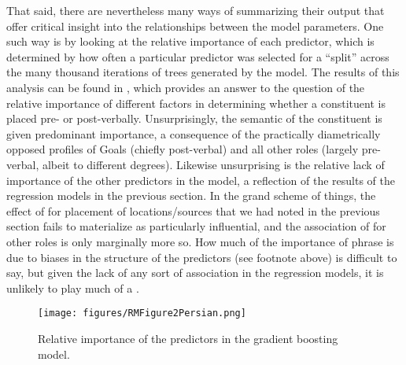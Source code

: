 \documentclass[output=paper,colorlinks,citecolor=brown,draftmode]{langscibook}
\begin{document}
That said, there are nevertheless many ways of summarizing their output that offer critical insight into the relationships between the model parameters. One such way is by looking at the relative importance of each predictor, which is determined by how often a particular predictor was selected for a ``split'' across the many thousand iterations of trees generated by the model. The results of this analysis can be found in , which provides an answer to the question of the relative importance of different factors in determining whether a constituent is placed pre- or post-verbally. Unsurprisingly, the semantic  of the constituent is given predominant importance, a consequence of the practically diametrically opposed profiles of Goals (chiefly post-verbal) and all other roles (largely pre-verbal, albeit to different degrees). Likewise unsurprising is the relative lack of importance of the other predictors in the model, a reflection of the results of the regression models in the previous section. In the grand scheme of things, the effect of  for placement of locations/sources that we had noted in the previous section fails to materialize as particularly influential, and the association of  for other  roles is only marginally more so. How much of the importance of phrase  is due to biases in the structure of the predictors (see footnote above) is difficult to say, but given the lack of any sort of association in the regression models, it is unlikely to play much of a .

\begin{figure}
 \texttt{[image: figures/RMFigure2Persian.png]}
 \caption{Relative importance of the predictors in the gradient boosting model.}
 \label{Persian:fig:2}
\end{figure}
\end{document}
